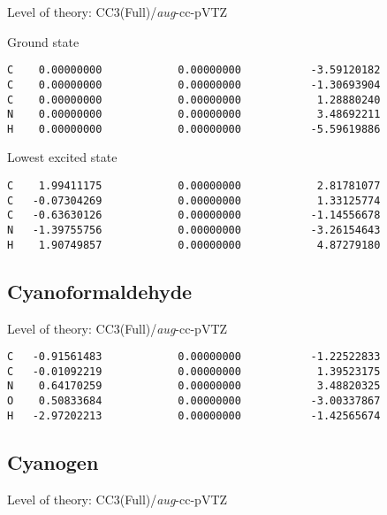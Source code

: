 \documentclass[journal=jctcce,manuscript=article,layout=traditional]{achemso}
\newcommand{\AVTZ}{\emph{aug}-cc-pVTZ}
\begin{document}
\begin{singlespace}
Level of theory: CC3(Full)/{\AVTZ}
\end{singlespace}

\begin{singlespace}
\noindent Ground state
\begin{verbatim}
C    0.00000000            0.00000000           -3.59120182
C    0.00000000            0.00000000           -1.30693904
C    0.00000000            0.00000000            1.28880240
N    0.00000000            0.00000000            3.48692211
H    0.00000000            0.00000000           -5.59619886
\end{verbatim}
\end{singlespace}

\begin{singlespace}
\noindent Lowest excited state
\begin{verbatim}
C    1.99411175            0.00000000            2.81781077
C   -0.07304269            0.00000000            1.33125774
C   -0.63630126            0.00000000           -1.14556678
N   -1.39755756            0.00000000           -3.26154643
H    1.90749857            0.00000000            4.87279180
\end{verbatim}
\end{singlespace}

\subsection*{Cyanoformaldehyde}

\begin{singlespace}
Level of theory: CC3(Full)/{\AVTZ}
\begin{verbatim}
C   -0.91561483            0.00000000           -1.22522833
C   -0.01092219            0.00000000            1.39523175
N    0.64170259            0.00000000            3.48820325
O    0.50833684            0.00000000           -3.00337867
H   -2.97202213            0.00000000           -1.42565674
\end{verbatim}
\end{singlespace}

\subsection*{Cyanogen}

\begin{singlespace}
Level of theory: CC3(Full)/{\AVTZ}
\end{singlespace}
\end{document}
